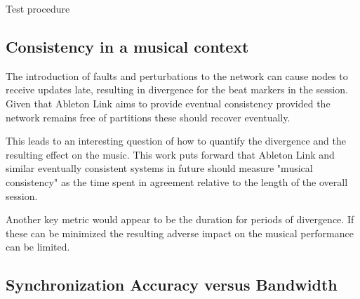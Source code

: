 \documentclass[11pt]{article} %
\theoremstyle{plain}
\theoremstyle{definition}
\begin{document}
\makeatletter
\def\BState{\State\hskip-\ALG@thistlm}
\makeatother

\begin{algorithm}
  \caption{Test procedure}\label{linktest}
\end{algorithm}

\subsection{Consistency in a musical context}

The introduction of faults and perturbations to the network can cause nodes to
receive updates late, resulting in divergence for the beat markers in the
session. Given that Ableton Link aims to provide eventual
consistency\cite{vogels2009eventually} provided the network remains free of
partitions these should recover eventually.

This leads to an interesting question of how to quantify the divergence and the
resulting effect on the music. This work puts forward that Ableton Link and
similar eventually consistent systems in future should measure "musical
consistency" as the time spent in agreement relative to the length of the
overall session.

Another key metric would appear to be the duration for periods of divergence.
If these can be minimized the resulting adverse impact on the musical
performance can be limited.

\subsection{Synchronization Accuracy versus Bandwidth}
\end{document}
